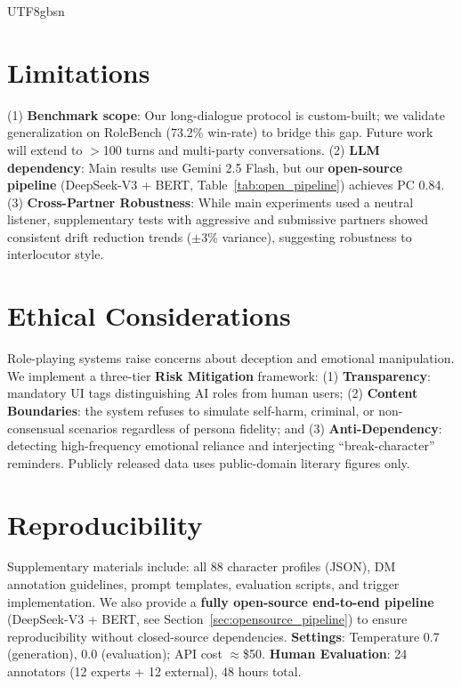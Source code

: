 \documentclass[11pt]{article}
\begin{document}
\begin{CJK*}{UTF8}{gbsn}
\section*{Limitations}

(1) \textbf{Benchmark scope}: Our long-dialogue protocol is custom-built; we validate generalization on RoleBench (73.2\% win-rate) to bridge this gap. Future work will extend to $>$100 turns and multi-party conversations. (2) \textbf{LLM dependency}: Main results use Gemini 2.5 Flash, but our \textbf{open-source pipeline} (DeepSeek-V3 + BERT, Table~\ref{tab:open_pipeline}) achieves PC 0.84. (3) \textbf{Cross-Partner Robustness}: While main experiments used a neutral listener, supplementary tests with aggressive and submissive partners showed consistent drift reduction trends ($\pm$3\% variance), suggesting robustness to interlocutor style.

\section*{Ethical Considerations}

Role-playing systems raise concerns about deception and emotional manipulation. We implement a three-tier \textbf{Risk Mitigation} framework: (1) \textbf{Transparency}: mandatory UI tags distinguishing AI roles from human users; (2) \textbf{Content Boundaries}: the system refuses to simulate self-harm, criminal, or non-consensual scenarios regardless of persona fidelity; and (3) \textbf{Anti-Dependency}: detecting high-frequency emotional reliance and interjecting ``break-character'' reminders. Publicly released data uses public-domain literary figures only.

\section*{Reproducibility}

Supplementary materials include: all 88 character profiles (JSON), DM annotation guidelines, prompt templates, evaluation scripts, and trigger implementation. We also provide a \textbf{fully open-source end-to-end pipeline} (DeepSeek-V3 + BERT, see Section~\ref{sec:opensource_pipeline}) to ensure reproducibility without closed-source dependencies. \textbf{Settings}: Temperature 0.7 (generation), 0.0 (evaluation); API cost $\approx$\$50. \textbf{Human Evaluation}: 24 annotators (12 experts + 12 external), 48 hours total.


\end{CJK*}
\end{document}
